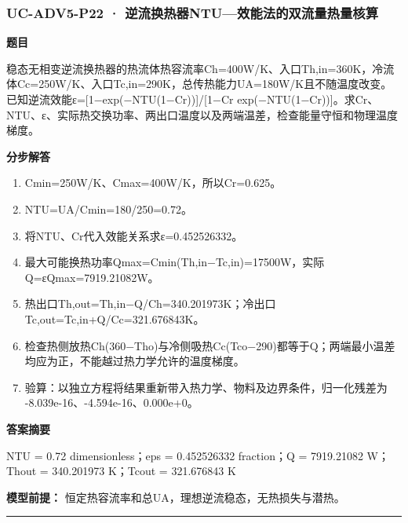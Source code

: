 \documentclass[UTF8,11pt,a4paper]{ctexart}
\begin{document}
\subsubsection*{UC-ADV5-P22 · 逆流换热器NTU—效能法的双流量热量核算}
\noindent\textbf{题目}\par
稳态无相变逆流换热器的热流体热容流率Ch=400W/K、入口Th,in=360K，冷流体Cc=250W/K、入口Tc,in=290K，总传热能力UA=180W/K且不随温度改变。已知逆流效能ε=[1−exp(−NTU(1−Cr))]/[1−Cr exp(−NTU(1−Cr))]。求Cr、NTU、ε、实际热交换功率、两出口温度以及两端温差，检查能量守恒和物理温度梯度。\par
\medskip\noindent\textbf{分步解答}
\begin{enumerate}
\item Cmin=250W/K、Cmax=400W/K，所以Cr=0.625。
\item NTU=UA/Cmin=180/250=0.72。
\item 将NTU、Cr代入效能关系求ε=0.452526332。
\item 最大可能换热功率Qmax=Cmin(Th,in−Tc,in)=17500W，实际Q=εQmax=7919.21082W。
\item 热出口Th,out=Th,in−Q/Ch=340.201973K；冷出口Tc,out=Tc,in+Q/Cc=321.676843K。
\item 检查热侧放热Ch(360−Tho)与冷侧吸热Cc(Tco−290)都等于Q；两端最小温差均应为正，不能越过热力学允许的温度梯度。
\item 验算：以独立方程将结果重新带入热力学、物料及边界条件，归一化残差为 -8.039e-16、-4.594e-16、0.000e+0。
\end{enumerate}
\noindent\textbf{答案摘要}\par
NTU = 0.72 dimensionless；eps = 0.452526332 fraction；Q = 7919.21082 W；Thout = 340.201973 K；Tcout = 321.676843 K\par
\noindent\textbf{模型前提：}
恒定热容流率和总UA，理想逆流稳态，无热损失与潜热。\par
\medskip\hrule\medskip
{}
\end{document}
